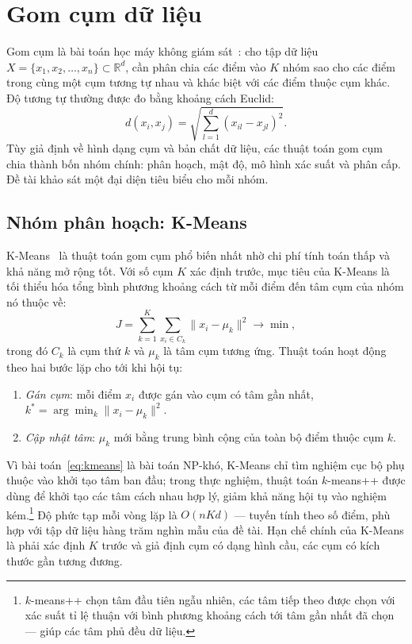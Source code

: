 \section{Gom cụm dữ liệu}
Gom cụm là bài toán học máy không giám sát~\cite{han}: cho tập dữ liệu $X = \{x_1, x_2, \dots, x_n\} \subset \mathbb{R}^d$, cần phân chia các điểm vào $K$ nhóm sao cho các điểm trong cùng một cụm tương tự nhau và khác biệt với các điểm thuộc cụm khác. Độ tương tự thường được đo bằng khoảng cách Euclid:
\begin{equation}
d(x_i, x_j) = \sqrt{\sum_{l=1}^{d} \left(x_{il} - x_{jl}\right)^2}.
\label{eq:euclid}
\end{equation}
Tùy giả định về hình dạng cụm và bản chất dữ liệu, các thuật toán gom cụm chia thành bốn nhóm chính: phân hoạch, mật độ, mô hình xác suất và phân cấp. Đề tài khảo sát một đại diện tiêu biểu cho mỗi nhóm.

\subsection{Nhóm phân hoạch: K-Means}
K-Means~\cite{macqueen, lloyd} là thuật toán gom cụm phổ biến nhất nhờ chi phí tính toán thấp và khả năng mở rộng tốt. Với số cụm $K$ xác định trước, mục tiêu của K-Means là tối thiểu hóa tổng bình phương khoảng cách từ mỗi điểm đến tâm cụm của nhóm nó thuộc về:
\begin{equation}
J = \sum_{k=1}^{K} \sum_{x_i \in C_k} \lVert x_i - \mu_k \rVert^2 \rightarrow \min,
\label{eq:kmeans}
\end{equation}
trong đó $C_k$ là cụm thứ $k$ và $\mu_k$ là tâm cụm tương ứng. Thuật toán hoạt động theo hai bước lặp cho tới khi hội tụ:
\begin{enumerate}[label=\textit{Bước \arabic*.},nosep]
 \item \textit{Gán cụm}: mỗi điểm $x_i$ được gán vào cụm có tâm gần nhất, $k^* = \arg\min_k \lVert x_i - \mu_k \rVert^2$.
 \item \textit{Cập nhật tâm}: $\mu_k$ mới bằng trung bình cộng của toàn bộ điểm thuộc cụm $k$.
\end{enumerate}
Vì bài toán~\eqref{eq:kmeans} là bài toán NP-khó, K-Means chỉ tìm nghiệm cục bộ phụ thuộc vào khởi tạo tâm ban đầu; trong thực nghiệm, thuật toán $k$-means++ được dùng để khởi tạo các tâm cách nhau hợp lý, giảm khả năng hội tụ vào nghiệm kém.\footnote{$k$-means++ chọn tâm đầu tiên ngẫu nhiên, các tâm tiếp theo được chọn với xác suất tỉ lệ thuận với bình phương khoảng cách tới tâm gần nhất đã chọn --- giúp các tâm phủ đều dữ liệu.} Độ phức tạp mỗi vòng lặp là $O(nKd)$ --- tuyến tính theo số điểm, phù hợp với tập dữ liệu hàng trăm nghìn mẫu của đề tài. Hạn chế chính của K-Means là phải xác định $K$ trước và giả định cụm có dạng hình cầu, các cụm có kích thước gần tương đương.

